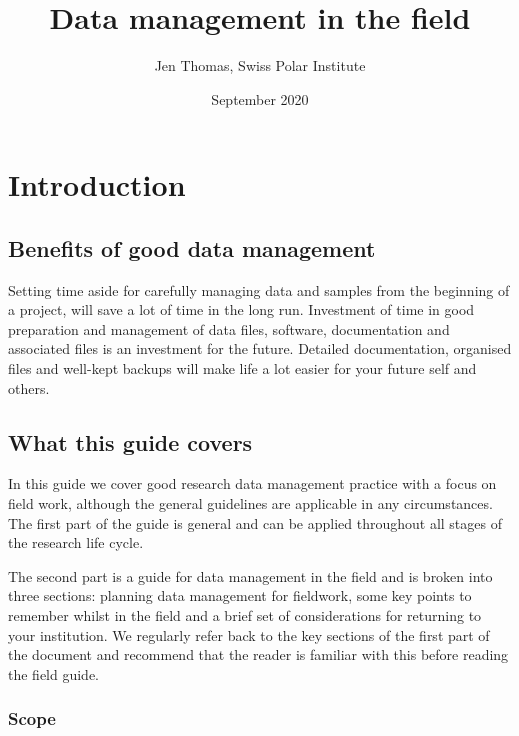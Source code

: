 \documentclass[a4paper,oneside]{report}
\title{Data management in the field}
\author{Jen Thomas, Swiss Polar Institute}
\date{September 2020}
\begin{document}
\maketitle

{
\hypersetup{linkcolor=}
\setcounter{tocdepth}{1}
\tableofcontents
}
\hypertarget{introduction}{%
\chapter{Introduction}\label{introduction}}

\hypertarget{benefits-of-good-data-management}{%
\section{Benefits of good data
management}\label{benefits-of-good-data-management}}

Setting time aside for carefully managing data and samples from the
beginning of a project, will save a lot of time in the long run.
Investment of time in good preparation and management of data files,
software, documentation and associated files is an investment for the
future. Detailed documentation, organised files and well-kept backups
will make life a lot easier for your future self and others.

\hypertarget{what-this-guide-covers}{%
\section{What this guide covers}\label{what-this-guide-covers}}

In this guide we cover good research data management practice with a
focus on field work, although the general guidelines are applicable in
any circumstances. The first part of the guide is general and can be
applied throughout all stages of the research life cycle.

The second part is a guide for data management in the field and is
broken into three sections: planning data management for fieldwork, some
key points to remember whilst in the field and a brief set of
considerations for returning to your institution. We regularly refer
back to the key sections of the first part of the document and recommend
that the reader is familiar with this before reading the field guide.

\hypertarget{scope}{%
\subsection{Scope}\label{scope}}
\end{document}
